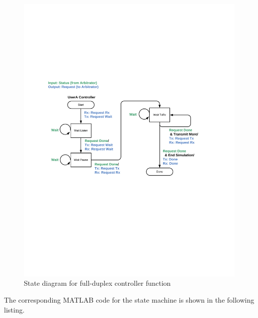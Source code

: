 \begin{figure}[h]
\centering
\includegraphics[width=5in]{figs/FD_State_Diagram}
\caption{State diagram for full-duplex controller function}
\label{fig:fdState}
\end{figure}

The corresponding MATLAB code for the state machine is shown in the
following listing.

